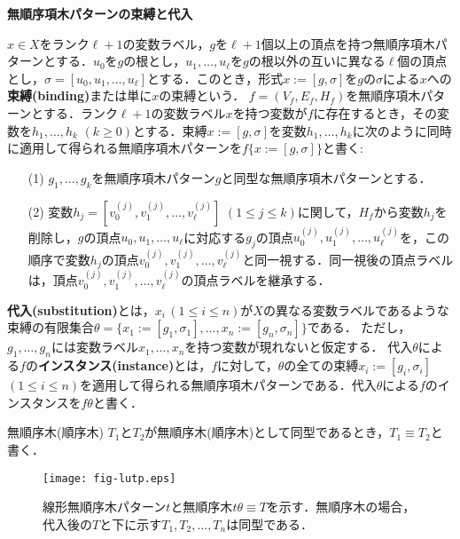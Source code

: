 \begin{define}{\bf 無順序項木パターンの束縛と代入}\par
  $x\in X$をランク$\ell+1$の変数ラベル，$g$を$\ell+1$個以上の頂点を持つ無順序項木パターンとする．$u_0$を$g$の根とし，$u_1,\ldots,u_{\ell}$を$g$の根以外の互いに異なる$\ell$個の頂点とし，$\sigma=[u_0,u_1,\ldots,u_{\ell}]$とする．このとき，形式$x:=[g,\sigma]$を$g$の$\sigma$による$x$への\textbf{束縛(binding)}または単に$x$の束縛という．
  $f=(V_{f},E_{f},H_{f})$を無順序項木パターンとする．ランク$\ell+1$の変数ラベル$x$を持つ変数が$f$に存在するとき，その変数を$h_1,\ldots,h_k$ $(k\geq 0)$とする．束縛$x:=[g,\sigma]$を変数$h_1,\ldots,h_k$に次のように同時に適用して得られる無順序項木パターンを$f\{x:=[g,\sigma]\}$と書く:
  \begin{enumerate}
    \item[(1)] $g_1,\ldots,g_k$を無順序項木パターン$g$と同型な無順序項木パターンとする．
    \item[(2)] 変数$h_j=[v_0^{(j)},v_1^{(j)},\ldots,v_{\ell}^{(j)}]$ $(1\leq j\leq k)$に関して，$H_f$から変数$h_j$を削除し，$g$の頂点$u_0,u_1,\ldots,u_{\ell}$に対応する$g_j$の頂点$u_0^{(j)},u_1^{(j)},\ldots,u_{\ell}^{(j)}$を，この順序で変数$h_j$の頂点$v_0^{(j)},v_1^{(j)},\ldots,v_{\ell}^{(j)}$と同一視する．同一視後の頂点ラベルは，頂点$v_0^{(j)},v_1^{(j)},\ldots,v_{\ell}^{(j)}$の頂点ラベルを継承する．
  \end{enumerate}
  \textbf{代入(substitution)}とは，$x_i\,(1\leq i\leq n)$が$X$の異なる変数ラベルであるような束縛の有限集合$\theta=\{x_1:=[g_1,\sigma_1],\ldots,x_n:=[g_n,\sigma_n]\}$である．
  ただし，$g_{1},\ldots,g_{n}$には変数ラベル$x_1,\ldots,x_n$を持つ変数が現れないと仮定する．
  代入$\theta$による$f$の\textbf{インスタンス(instance)}とは，$f$に対して，$\theta$の全ての束縛$x_i:=[g_i,\sigma_i]$ $(1\leq i\leq n)$を適用して得られる無順序項木パターンである．代入$\theta$による$f$のインスタンスを$f\theta$と書く．

  無順序木(順序木) $T_1$と$T_2$が無順序木(順序木)として同型であるとき，$T_1\equiv T_2$と書く．

  \begin{figure}[tb]
    \centering
    \texttt{[image: fig-lutp.eps]}
    \caption{線形無順序木パターン$t$と無順序木$t\theta \equiv T$を示す．無順序木の場合，代入後の$T$と下に示す$T_1,T_2,\ldots ,T_n$は同型である．}\label{fig:lutp} %
  \end{figure}


\end{define}
